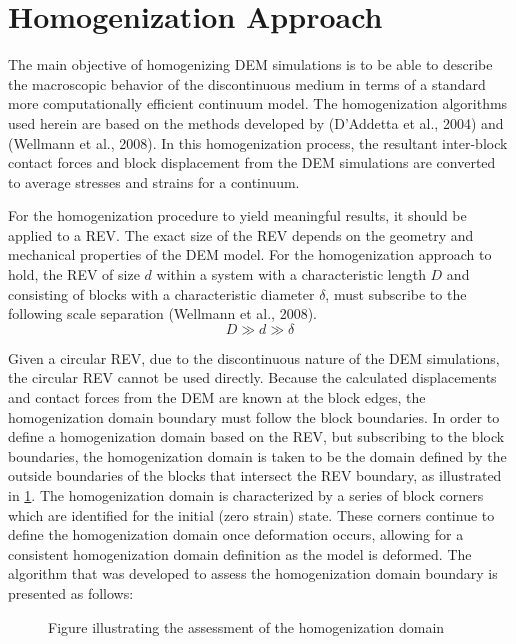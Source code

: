 \section{Homogenization Approach}
The main objective of homogenizing DEM simulations is to be able to describe the macroscopic behavior of the discontinuous medium in terms of a standard more computationally efficient continuum model. The homogenization algorithms used herein are based on the methods developed by (D’Addetta et al., 2004) and (Wellmann et al., 2008). In this homogenization process, the resultant inter-block contact forces and block displacement from the DEM simulations are converted to average stresses and strains for a continuum.

For the homogenization procedure to yield meaningful results, it should be applied to a REV. The exact size of the REV depends on the geometry and mechanical properties of the DEM model. For the homogenization approach to hold, the REV of size $d$ within a system with a characteristic length $D$ and consisting of blocks with a characteristic diameter $\delta$, must subscribe to the following scale separation (Wellmann et al., 2008).
\begin{equation}
\label{eqn:hom1a}
D \gg d \gg \delta
\end{equation}


Given a circular REV, due to the discontinuous nature of the DEM simulations, the circular REV cannot be used directly. Because the calculated displacements and contact forces from the DEM are known at the block edges, the homogenization domain boundary must follow the block boundaries. In order to define a homogenization domain based on the REV, but subscribing to the block boundaries, the homogenization domain is taken to be the domain defined by the outside boundaries of the blocks that intersect the REV boundary, as illustrated in \ref{fig:vorDFN}. The homogenization domain is characterized by a series of block corners which are identified for the initial (zero strain) state. These corners continue to define the homogenization domain once deformation occurs, allowing for a consistent homogenization domain definition as the model is deformed. The algorithm that was developed to assess the homogenization domain boundary is presented as follows:
\begin{figure}
	\label{fig:vorDFN}
	\caption{Figure illustrating the assessment of the homogenization domain}
\end{figure}

